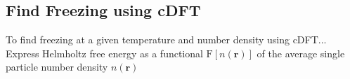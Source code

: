 \documentclass{beamer}
\renewcommand{\vec}[1]{\mathbf{#1}}
\begin{document}
\subsection{Find Freezing using cDFT}
\begin{frame}{To find freezing at a given temperature and number density using cDFT...}
     \large
     \center Express Helmholtz free energy as a functional  
     \center $\text{F}[n(\vec r)]$ 
     \center of the average single particle number density $n(\vec r)$
     \normalsize
\begin{block}{}
      \begin{itemize}

\end{itemize}
\end{block}
\end{frame}
\end{document}
